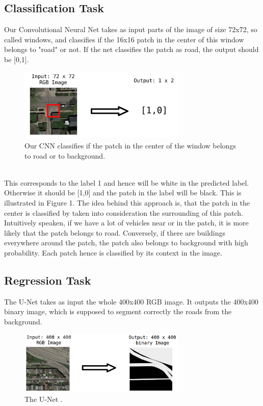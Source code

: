 \documentclass[10pt,conference,compsocconf]{IEEEtran}
\begin{document}
\subsection{Classification Task}

Our Convolutional Neural Net takes as input parts of the image of size 72x72, so called windows, and classifies if the 16x16 patch in the center of this window belongs to "road" or not. If the net classifies the patch as road, the output should be [0,1].
\begin{figure}[htbp]
	\centering
	\includegraphics[width=8cm]{images/classificationTask.png}
	\caption{Our CNN classifies if the patch in the center of the window belongs to road or to background.}
	\vspace{-3mm}
	\label{fig:clas}
\end{figure}
\\
This corresponds to the label 1 and hence will be white in the predicted label.  Otherwise it should be [1,0] and the patch in the label will be black. This is illustrated in Figure 1. 
The idea behind this approach is, that the patch in the center is classified by taken into consideration the surrounding of this patch. Intuitively speaken, if we have a lot of vehicles near or in the patch, it is more likely that the patch belongs to road. Conversely, if there are buildings everywhere around the patch, the patch also belongs to background with high probability. Each patch hence is classified by its context in the image. 
\subsection{Regression Task}
The U-Net takes as input the whole 400x400 RGB image. It outputs the 400x400 binary image, which is supposed to segment correctly the roads from the background.
\begin{figure}[htbp]
	\centering
	\includegraphics[width=8cm]{images/regressionTask.png}
	\caption{The U-Net .}
	\vspace{-3mm}
	\label{fig:regr}
\end{figure}
\end{document}
